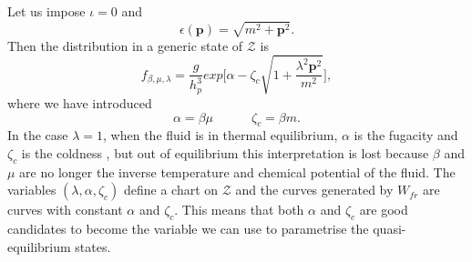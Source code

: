 \documentclass[useAMS,usenatbib,prd,twocolumn,nofootinbib]{revtex4-1}
\newcommand{\vect}[1]{\mathbf{{#1}}}
\newcommand{\spc}{\quad \quad \quad}
\begin{document}
Let us impose $\iota =0$ and
\begin{equation}
\epsilon(\vect{p}) = \sqrt{m^2 + \vect{p}^2}.
\end{equation}
Then the distribution in a generic state of $\mathcal{Z}$ is
\begin{equation}\label{lanostraflaNOOOOSTRA}
f_{\beta,\mu,\lambda} =\dfrac{g}{h_p^3} exp\bigg[ \alpha - \zeta_c \sqrt{1 + \dfrac{\lambda^2 \vect{p}^2}{m^2} }  \bigg],
\end{equation}
where we have introduced
\begin{equation}\label{interpretoinuoviarrivati}
\alpha = \beta \mu  \spc  \zeta_c = \beta m .
\end{equation}
In the case $\lambda = 1$, when the fluid is in thermal equilibrium, $\alpha$ is the fugacity and $\zeta_c$ is the coldness \cite{rezzolla_book}, but out of equilibrium this interpretation is lost because $\beta$ and $\mu$ are no longer the inverse temperature and chemical potential of the fluid. The variables $(\lambda,\alpha,\zeta_c)$ define a chart on $\mathcal{Z}$ and the curves generated by $W_{fr}$ are curves with constant $\alpha$ and $\zeta_c$. This means that both $\alpha$ and $\zeta_c$ are good candidates to become the variable we can use to parametrise the quasi-equilibrium states.
\end{document}
